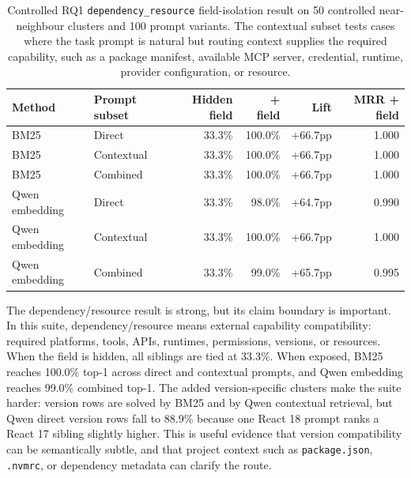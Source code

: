 \begin{table}[H]
\centering
\scriptsize
\setlength{\tabcolsep}{2pt}
\begin{tabular}{p{}p{}rrrr}
\toprule
Method & Prompt subset & Hidden field & + field & Lift & MRR + field \\
\midrule
BM25 & Direct & 33.3\% & 100.0\% & +66.7pp & 1.000 \\
BM25 & Contextual & 33.3\% & 100.0\% & +66.7pp & 1.000 \\
BM25 & Combined & 33.3\% & 100.0\% & +66.7pp & 1.000 \\
Qwen embedding & Direct & 33.3\% & 98.0\% & +64.7pp & 0.990 \\
Qwen embedding & Contextual & 33.3\% & 100.0\% & +66.7pp & 1.000 \\
Qwen embedding & Combined & 33.3\% & 99.0\% & +65.7pp & 0.995 \\
\bottomrule
\end{tabular}
\caption{Controlled RQ1 \texttt{dependency\_resource} field-isolation result on 50 controlled near-neighbour clusters and 100 prompt variants. The contextual subset tests cases where the task prompt is natural but routing context supplies the required capability, such as a package manifest, available MCP server, credential, runtime, provider configuration, or resource.}
\label{tab:rq1a-dependency-resource-isolation}
\end{table}

The dependency/resource result is strong, but its claim boundary is important. In this suite, dependency/resource means external capability compatibility: required platforms, tools, APIs, runtimes, permissions, versions, or resources. When the field is hidden, all siblings are tied at 33.3\%. When exposed, BM25 reaches 100.0\% top-1 across direct and contextual prompts, and Qwen embedding reaches 99.0\% combined top-1. The added version-specific clusters make the suite harder: version rows are solved by BM25 and by Qwen contextual retrieval, but Qwen direct version rows fall to 88.9\% because one React 18 prompt ranks a React 17 sibling slightly higher. This is useful evidence that version compatibility can be semantically subtle, and that project context such as \texttt{package.json}, \texttt{.nvmrc}, or dependency metadata can clarify the route.

